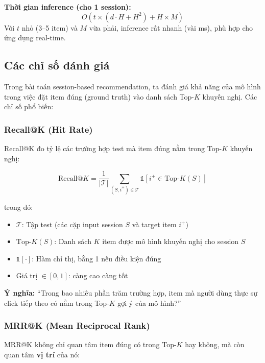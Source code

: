 \documentclass[12pt, a4paper]{article}
\begin{document}
\textbf{Thời gian inference (cho 1 session):}
\begin{equation}
    O(t \times (d \cdot H + H^2) + H \times M)
\end{equation}
Với $t$ nhỏ (3--5 item) và $M$ vừa phải, inference rất nhanh (vài ms), phù hợp cho ứng dụng real-time.

\subsection{Các chỉ số đánh giá}

Trong bài toán session-based recommendation, ta đánh giá khả năng của mô hình trong việc đặt item đúng (ground truth) vào danh sách Top-$K$ khuyến nghị. Các chỉ số phổ biến:

\subsubsection{Recall@K (Hit Rate)}

Recall@K đo tỷ lệ các trường hợp test mà item đúng nằm trong Top-$K$ khuyến nghị:

\begin{equation}
\boxed{
    \text{Recall@}K = \frac{1}{|\mathcal{T}|} \sum_{(S, i^+) \in \mathcal{T}} \mathbb{1}\left[i^+ \in \text{Top-}K(S)\right]
}
\label{eq:recall}
\end{equation}

trong đó:
\begin{itemize}
    \item $\mathcal{T}$: Tập test (các cặp input session $S$ và target item $i^+$)
    \item $\text{Top-}K(S)$: Danh sách $K$ item được mô hình khuyến nghị cho session $S$
    \item $\mathbb{1}[\cdot]$: Hàm chỉ thị, bằng 1 nếu điều kiện đúng
    \item Giá trị $\in [0, 1]$: càng cao càng tốt
\end{itemize}

\textbf{Ý nghĩa:} ``Trong bao nhiêu phần trăm trường hợp, item mà người dùng thực sự click tiếp theo có nằm trong Top-$K$ gợi ý của mô hình?''

\subsubsection{MRR@K (Mean Reciprocal Rank)}

MRR@K không chỉ quan tâm item đúng có trong Top-$K$ hay không, mà còn quan tâm \textbf{vị trí} của nó:
\end{document}

